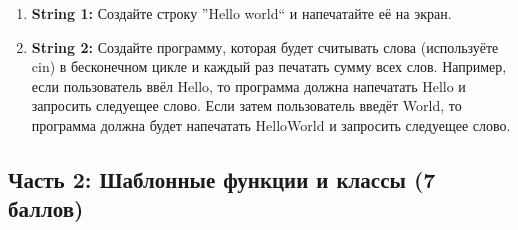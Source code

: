 \documentclass{article}
\begin{document}
\begin{enumerate}
\item \textbf{String 1:} Создайте строку ''Hello world`` и напечатайте её на экран.
\item \textbf{String 2:} Создайте программу, которая будет считывать слова (используёте cin) в бесконечном цикле и каждый раз печатать сумму всех слов. Например, если пользователь ввёл Hello, то программа должна напечатать Hello и запросить следуещее слово. Если затем пользователь введёт World, то программа должна будет напечатать HelloWorld и запросить следуещее слово.
\end{enumerate}

\newpage
\subsection*{Часть 2: Шаблонные функции и классы (7 баллов)}
\end{document}
